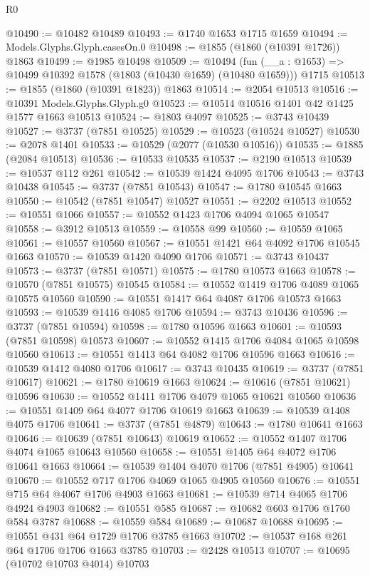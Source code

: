 \begin{lexlean}{R0}
\begin{coremodule}
@10490 := @10482 @10489
@10493 := @1740 @1653 @1715 @1659
@10494 := Models.Glyphs.Glyph.casesOn.{0}
@10498 := @1855 (@1860 (@10391 @1726)) @1863
@10499 := @1985 @10498
@10509 := @10494
    (fun (__a : @1653) => @10499 @10392 @1578 (@1803 (@10430 @1659) (@10480 @1659)))
    @1715
@10513 := @1855 (@1860 (@10391 @1823)) @1863
@10514 := @2054 @10513
@10516 := @10391 Models.Glyphs.Glyph.g0
@10523 := @10514 @10516 @1401 @42 @1425 @1577 @1663 @10513
@10524 := @1803 @4097
@10525 := @3743 @10439
@10527 := @3737 (@7851 @10525)
@10529 := @10523 (@10524 @10527)
@10530 := @2078 @1401
@10533 := @10529 (@2077 (@10530 @10516))
@10535 := @1885 (@2084 @10513)
@10536 := @10533 @10535
@10537 := @2190 @10513
@10539 := @10537 @112 @261
@10542 := @10539 @1424 @4095 @1706
@10543 := @3743 @10438
@10545 := @3737 (@7851 @10543)
@10547 := @1780 @10545 @1663
@10550 := @10542 (@7851 @10547) @10527
@10551 := @2202 @10513
@10552 := @10551 @1066
@10557 := @10552 @1423 @1706 @4094 @1065 @10547
@10558 := @3912 @10513
@10559 := @10558 @99
@10560 := @10559 @1065
@10561 := @10557 @10560
@10567 := @10551 @1421 @64 @4092 @1706 @10545 @1663
@10570 := @10539 @1420 @4090 @1706
@10571 := @3743 @10437
@10573 := @3737 (@7851 @10571)
@10575 := @1780 @10573 @1663
@10578 := @10570 (@7851 @10575) @10545
@10584 := @10552 @1419 @1706 @4089 @1065 @10575 @10560
@10590 := @10551 @1417 @64 @4087 @1706 @10573 @1663
@10593 := @10539 @1416 @4085 @1706
@10594 := @3743 @10436
@10596 := @3737 (@7851 @10594)
@10598 := @1780 @10596 @1663
@10601 := @10593 (@7851 @10598) @10573
@10607 := @10552 @1415 @1706 @4084 @1065 @10598 @10560
@10613 := @10551 @1413 @64 @4082 @1706 @10596 @1663
@10616 := @10539 @1412 @4080 @1706
@10617 := @3743 @10435
@10619 := @3737 (@7851 @10617)
@10621 := @1780 @10619 @1663
@10624 := @10616 (@7851 @10621) @10596
@10630 := @10552 @1411 @1706 @4079 @1065 @10621 @10560
@10636 := @10551 @1409 @64 @4077 @1706 @10619 @1663
@10639 := @10539 @1408 @4075 @1706
@10641 := @3737 (@7851 @4879)
@10643 := @1780 @10641 @1663
@10646 := @10639 (@7851 @10643) @10619
@10652 := @10552 @1407 @1706 @4074 @1065 @10643 @10560
@10658 := @10551 @1405 @64 @4072 @1706 @10641 @1663
@10664 := @10539 @1404 @4070 @1706 (@7851 @4905) @10641
@10670 := @10552 @717 @1706 @4069 @1065 @4905 @10560
@10676 := @10551 @715 @64 @4067 @1706 @4903 @1663
@10681 := @10539 @714 @4065 @1706 @4924 @4903
@10682 := @10551 @585
@10687 := @10682 @603 @1706 @1760 @584 @3787
@10688 := @10559 @584
@10689 := @10687 @10688
@10695 := @10551 @431 @64 @1729 @1706 @3785 @1663
@10702 := @10537 @168 @261 @64 @1706 @1706 @1663 @3785
@10703 := @2428 @10513
@10707 := @10695 (@10702 @10703 @4014) @10703

\end{coremodule}
\end{lexlean}
